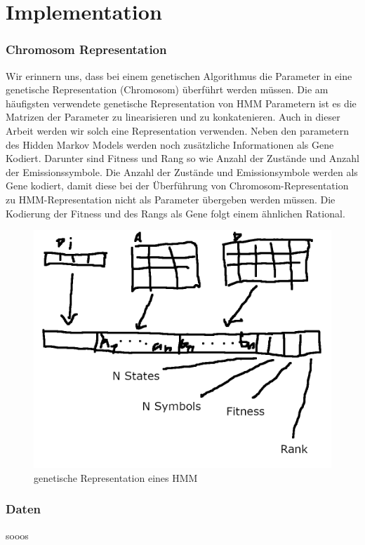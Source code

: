 \chapter{Implementation}\label{ch:implementation}

\subsection*{Chromosom Representation}
Wir erinnern uns, dass bei einem genetischen Algorithmus die Parameter in eine genetische Representation (Chromosom) überführt werden müssen. Die am häufigsten verwendete genetische Representation von HMM Parametern ist es die Matrizen der Parameter zu linearisieren und zu konkatenieren. Auch in dieser Arbeit werden wir solch eine Representation verwenden. Neben den parametern des Hidden Markov Models werden noch zusätzliche Informationen als Gene Kodiert. Darunter sind Fitness und Rang so wie Anzahl der Zustände und Anzahl der Emissionssymbole. Die Anzahl der Zustände und Emissionsymbole werden als Gene kodiert, damit diese bei der Überführung von Chromosom-Representation zu HMM-Representation nicht als Parameter übergeben werden müssen. Die Kodierung der Fitness und des Rangs als Gene folgt einem ähnlichen Rational.
\begin{figure}[h!]
    \includegraphics[scale=1.0]{images/Hmm_Chromosom_Representation.png}
    \caption{genetische Representation eines HMM}
    \label{fig:hmm_genetic_representation}
\end{figure}

\subsection*{Daten}
sooos

